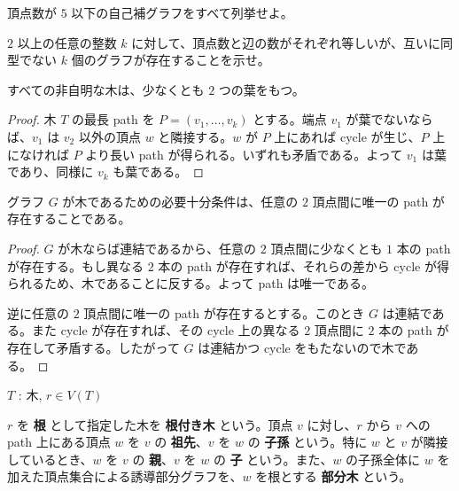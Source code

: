 \documentclass[article,paper=a4paper]{jlreq}
\begin{document}
\begin{prob}
  頂点数が $5$ 以下の自己補グラフをすべて列挙せよ。
\end{prob}

\begin{prob}
  $2$ 以上の任意の整数 $k$ に対して、頂点数と辺の数がそれぞれ等しいが、互いに同型でない $k$ 個のグラフが存在することを示せ。
\end{prob}


\begin{prop}
  すべての非自明な木は、少なくとも $2$ つの葉をもつ。
\end{prop}

\begin{proof}
  木 $T$ の最長 path を $P=(v_1,\ldots,v_k)$ とする。端点 $v_1$ が葉でないならば、$v_1$ は $v_2$ 以外の頂点 $w$ と隣接する。$w$ が $P$ 上にあれば cycle が生じ、$P$ 上になければ $P$ より長い path が得られる。いずれも矛盾である。よって $v_1$ は葉であり、同様に $v_k$ も葉である。
\end{proof}

\begin{prop}
  グラフ $G$ が木であるための必要十分条件は、任意の $2$ 頂点間に唯一の path が存在することである。
\end{prop}

\begin{proof}
  $G$ が木ならば連結であるから、任意の $2$ 頂点間に少なくとも $1$ 本の path が存在する。もし異なる $2$ 本の path が存在すれば、それらの差から cycle が得られるため、木であることに反する。よって path は唯一である。

  逆に任意の $2$ 頂点間に唯一の path が存在するとする。このとき $G$ は連結である。また cycle が存在すれば、その cycle 上の異なる $2$ 頂点間に $2$ 本の path が存在して矛盾する。したがって $G$ は連結かつ cycle をもたないので木である。
\end{proof}

\begin{dfn}
  \quad $T$ : 木, \quad $r \in V(T)$\par
  $r$ を \textbf{根} として指定した木を \textbf{根付き木} という。頂点 $v$ に対し、$r$ から $v$ への path 上にある頂点 $w$ を $v$ の \textbf{祖先}、$v$ を $w$ の \textbf{子孫} という。特に $w$ と $v$ が隣接しているとき、$w$ を $v$ の \textbf{親}、$v$ を $w$ の \textbf{子} という。また、$w$ の子孫全体に $w$ を加えた頂点集合による誘導部分グラフを、$w$ を根とする \textbf{部分木} という。
\end{dfn}
\end{document}
